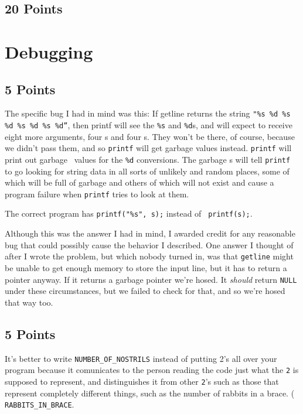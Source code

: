 \subsection{20 Points}


\section{Debugging}

\subsection{5 Points}

The specific bug I had in mind was this: If getline returns the string
{\tt "\%s \%d \%s \%d \%s \%d \%s \%d''}, then printf will see the
{\tt\%s} and {\tt \%d}s, and will expect to receive eight more
arguments, four \Char s and four \int s.  They won't be there, of
course, because we didn't pass them, and so {\tt printf} will get
garbage values instead.  {\tt printf} will print out garbage \int\
values for the {\tt\%d} conversions.  The garbage \Char s will tell
{\tt printf} to go looking for string data in all sorts of unlikely and
random places, some of which will be full of garbage and others of which
will not exist and cause a program failure when {\tt printf} tries to
look at them.

The correct program has {\tt printf("\%s", s);} instead of {\tt
printf(s);}.

Although this was the answer I had in mind, I awarded credit for any
reasonable bug that could possibly cause the behavior I described.  One
answer I thought of after I wrote the problem, but which nobody turned
in, was that {\tt getline} might be unable to get enough memory to store
the input line, but it has to return a pointer anyway.  If it returns a
garbage pointer we're hosed.  It {\em should}\/ return {\tt NULL} under
these circumstances, but we failed to check for that, and so we're hosed
that way too.

\subsection{5 Points}

It's better to write {\tt NUMBER\_OF\_NOSTRILS} instead of putting 2's
all over your program because it comunicates to the person reading the
code just what the {\tt 2} is supposed to represent, and distinguishes
it from other {\tt 2}'s such as those that represent completely
different things, such as the number of rabbits in a brace.  ({\tt
RABBITS\_IN\_BRACE}.  

